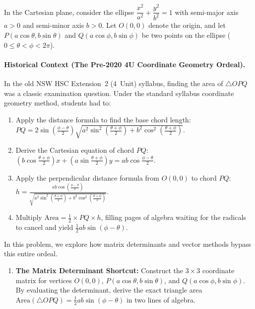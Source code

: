 \begin{problem}
In the Cartesian plane, consider the ellipse $\dfrac{x^2}{a^2} + \dfrac{y^2}{b^2} = 1$ with semi-major axis $a > 0$ and semi-minor axis $b > 0$. Let $O(0,0)$ denote the origin, and let $P(a\cos\theta, b\sin\theta)$ and $Q(a\cos\phi, b\sin\phi)$ be two points on the ellipse ($0 \le \theta < \phi < 2\pi$).

\paragraph{Historical Context (The Pre-2020 4U Coordinate Geometry Ordeal).}
In the old NSW HSC Extension~2 (4~Unit) syllabus, finding the area of $\triangle OPQ$ was a classic examination question. Under the standard syllabus coordinate geometry method, students had to:
\begin{enumerate}[label=(\roman*),leftmargin=*]
    \item Apply the distance formula to find the base chord length: $PQ = 2\sin\left(\frac{\phi-\theta}{2}\right)\sqrt{a^2\sin^2\left(\frac{\theta+\phi}{2}\right) + b^2\cos^2\left(\frac{\theta+\phi}{2}\right)}$.
    \item Derive the Cartesian equation of chord $PQ$: $\left(b\cos\frac{\theta+\phi}{2}\right)x + \left(a\sin\frac{\theta+\phi}{2}\right)y = ab\cos\frac{\phi-\theta}{2}$.
    \item Apply the perpendicular distance formula from $O(0,0)$ to chord $PQ$: $h = \frac{ab\cos\left(\frac{\phi-\theta}{2}\right)}{\sqrt{a^2\sin^2\left(\frac{\theta+\phi}{2}\right) + b^2\cos^2\left(\frac{\theta+\phi}{2}\right)}}$.
    \item Multiply $\text{Area} = \frac{1}{2} \times PQ \times h$, filling pages of algebra waiting for the radicals to cancel and yield $\frac{1}{2}ab\sin(\phi - \theta)$.
\end{enumerate}
In this problem, we explore how matrix determinants and vector methods bypass this entire ordeal.

\begin{enumerate}[label=\textbf{(\alph*)}]
    \item \textbf{The Matrix Determinant Shortcut:}
    Construct the $3 \times 3$ coordinate matrix for vertices $O(0,0)$, $P(a\cos\theta, b\sin\theta)$, and $Q(a\cos\phi, b\sin\phi)$. By evaluating the determinant, derive the exact triangle area $\text{Area}(\triangle OPQ) = \frac{1}{2}ab\sin(\phi - \theta)$ in two lines of algebra.


\end{enumerate}
\end{problem}
